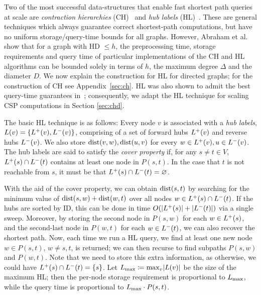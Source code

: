 Two of the most successful data-structures that enable fast shortest path queries at scale are \emph{contraction hierarchies} (CH)~\cite{geisberger_ch_definition} and \emph{hub labels} (HL)~\cite{cohen_definition_hl}.
These are general techniques which always guarantee correct shortest-path computations, but have no uniform storage/query-time bounds for all graphs.
However, Abraham et al.~\cite{highway2013} show that for a graph with HD $\leq h$, the preprocessing time, storage requirements and query time of particular implementations of the CH and HL algorithms can be bounded solely in terms of $h$, the maximum degree $\Delta$ and the diameter $D$. 
We now explain the construction for HL for directed graphs; for the construction of CH see Appendix~\ref{sec:ch}.
HL was also shown to admit the best query-time guarantees in~\cite{highway2013}; consequently, we adapt the HL technique for scaling CSP computations in Section \ref{sec:chd}.

The basic HL technique is as follows:
Every node $v$ is associated with a \emph{hub labels}, $L(v) = \crl*{\Lf(v),\Lb(v)}$, comprising of a set of forward hubs $\Lf(v)$ and reverse hubs $\Lb(v)$.
We also store $\dist(v,w),\dist(u,v)$ for every $w\in\Lf(v),u\in\Lb(v)$.
The hub labels are said to satisfy the \emph{cover property} if, for any $s\neq t\in V$, $\Lf(s)\cap\Lb(t)$ contains at least one node in $P(s,t)$.
In the case that $t$ is not reachable from $s$, it must be that $\Lf(s)\cap\Lb(t)=\varnothing$.

With the aid of the cover property, we can obtain $\dist(s,t)$ by searching for the minimum value of $\dist(s,w)+\dist(w,t)$ over all nodes $w\in\Lf(s)\cap\Lb(t)$.
If the hubs are sorted by ID, this can be done in time $\Or(\card{\Lf(s)}+\card{\Lb(t)})$ via a single sweep.
Moreover, by storing the second node in $P(s,w)$ for each $w\in \Lf(s)$, and the second-last node in $P(w,t)$ for each $w\in \Lb(t)$, we can also recover the shortest path.
Now, each time we run a HL query, we find at least one new node $w\in P(s,t)$, $w\neq s,t$, is returned; we can then recurse to find subpaths $P(s,w)$ and $P(w,t)$.
Note that we need to store this extra information, as otherwise, we could have $\Lf(s)\cap\Lb(t)=\{s\}$.
Let $\Lm \defeq \max_v\abs*{L(v)}$ be the size of the maximum HL; then the per-node storage requirement is proportional to $\Lm$, while the query time is proportional to $\Lm\cdot P(s,t)$.

